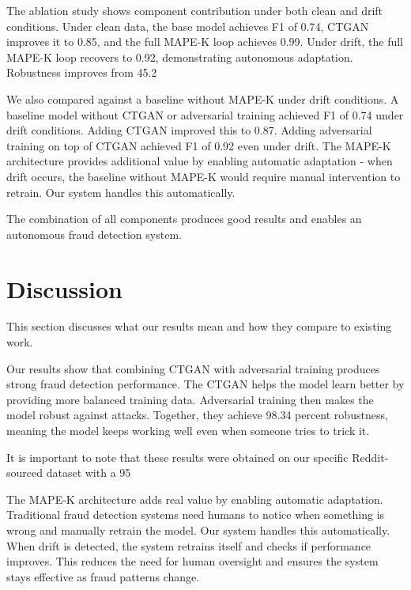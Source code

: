 \documentclass{svproc}
\begin{document}
The ablation study shows component contribution under both clean and drift conditions. Under clean data, the base model achieves F1 of 0.74, CTGAN improves it to 0.85, and the full MAPE-K loop achieves 0.99. Under drift, the full MAPE-K loop recovers to 0.92, demonstrating autonomous adaptation. Robustness improves from 45.2%

We also compared against a baseline without MAPE-K under drift conditions. A baseline model without CTGAN or adversarial training achieved F1 of 0.74 under drift conditions. Adding CTGAN improved this to 0.87. Adding adversarial training on top of CTGAN achieved F1 of 0.92 even under drift. The MAPE-K architecture provides additional value by enabling automatic adaptation - when drift occurs, the baseline without MAPE-K would require manual intervention to retrain. Our system handles this automatically.

The combination of all components produces good results and enables an autonomous fraud detection system.

\section{Discussion}\label{sec:discussion}
This section discusses what our results mean and how they compare to existing work.

Our results show that combining CTGAN with adversarial training produces strong fraud detection performance. The CTGAN helps the model learn better by providing more balanced training data. Adversarial training then makes the model robust against attacks. Together, they achieve 98.34 percent robustness, meaning the model keeps working well even when someone tries to trick it.

It is important to note that these results were obtained on our specific Reddit-sourced dataset with a 95%

The MAPE-K architecture adds real value by enabling automatic adaptation. Traditional fraud detection systems need humans to notice when something is wrong and manually retrain the model. Our system handles this automatically. When drift is detected, the system retrains itself and checks if performance improves. This reduces the need for human oversight and ensures the system stays effective as fraud patterns change.
\end{document}
